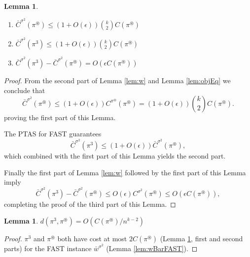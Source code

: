 \documentclass[dvips,11pt,letter]{article}
\newtheorem{lemma}[theorem]{Lemma}
\begin{document}
\begin{lemma}\label{lem:fastCheap} $~$
\begin{enumerate}
\item 
$\bar C^{\sigma^2}(\pi^\circledast) \le (1+O(\epsilon)) \binom{k}{2} C(\pi^\circledast)$
\item
$\bar C^{\sigma^2}(\pi^3) \le (1+O(\epsilon)) \binom{k}{2} C(\pi^\circledast)$
\item
$\bar C^{\sigma^2}(\pi^3) - \bar C^{\sigma^2}(\pi^\circledast) = O(\epsilon C(\pi^\circledast))$
\end{enumerate}
\end{lemma}
\begin{proof}
From the second part of Lemma \ref{lem:w} and Lemma \ref{lem:objEq} we conclude that
\begin{equation*}
\bar C^{\sigma^2}(\pi^\circledast) \le (1+O(\epsilon)) C^{\pi^\circledast}(\pi^\circledast) = (1+O(\epsilon))\binom{k}{2} C(\pi^\circledast)
.\end{equation*}
proving the first part of this Lemma.

The PTAS for FAST guarantees
\begin{equation}
\bar C^{\sigma^2}(\pi^3) \le (1+O(\epsilon)) \bar C^{\sigma^2}(\pi^\circledast)  \label{eqn:fcOne}
,\end{equation}
which combined with the first part  of this Lemma yields the second part.

Finally the first part of Lemma \ref{lem:w} followed by the first part of this Lemma imply
\[
\bar C^{\sigma^2}(\pi^3) - \bar C^{\sigma^2}(\pi^\circledast) \le O(\epsilon) C^{\sigma^2}(\pi^\circledast) \le O(\epsilon C(\pi^\circledast))
,\]
completing the proof of the third part of this Lemma.
\end{proof}

\begin{lemma}\label{lem:Dsmall}
$d(\pi^3,\pi^\circledast)= O(C(\pi^\circledast) / n^{k-2})$
\end{lemma}
\begin{proof}
$\pi^3$ and $\pi^\circledast$ both have cost at most $2 C(\pi^\circledast)$ (Lemma \ref{lem:fastCheap}, first and second parts) for the FAST instance $\bar w^{\sigma^2}$ (Lemma \ref{lem:wBarFAST}).
\end{proof}
\end{document}
